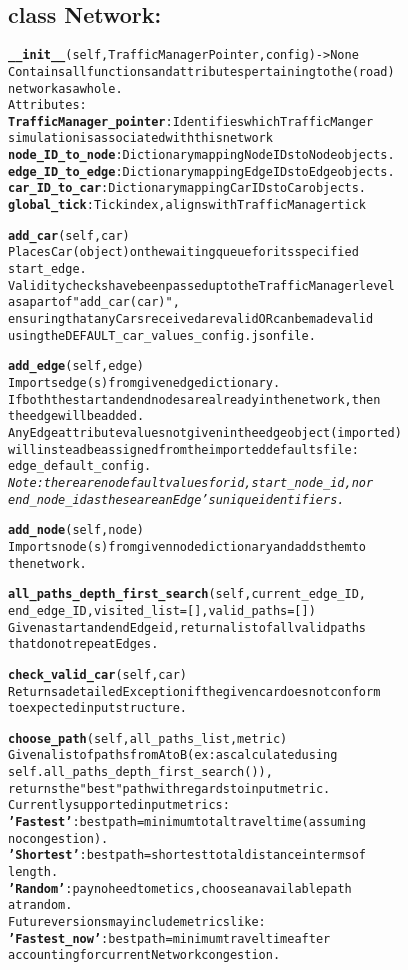 \subsection{class Network:}
\begin{alltt}

\textbf{__init__}(self, TrafficManagerPointer, config) -> None
Contains all functions and attributes pertaining to the (road) 
network as a whole.
Attributes:
    \textbf{TrafficManager_pointer}:  Identifies which TrafficManger 
    simulation is associated with this network
    \textbf{node_ID_to_node}:  Dictionary mapping Node IDs to Node objects.
    \textbf{edge_ID_to_edge}:  Dictionary mapping Edge IDs to Edge objects.
    \textbf{car_ID_to_car}:  Dictionary mapping Car IDs to Car objects.
    \textbf{global_tick}:  Tick index, aligns with TrafficManager tick

\textbf{add_car}(self, car)
Places Car (object) on the waiting queue for its specified 
start_edge.
Validity checks have been passed up to the TrafficManager level 
as a part of "add_car(car)",
ensuring that any Cars received are valid OR can be made valid 
using the DEFAULT_car_values_config.json file.

\textbf{add_edge}(self, edge)
Imports edge(s) from given edge dictionary.
If both the start and end nodes are already in the network, then 
the edge will be added.
Any Edge attribute values not given in the edge object (imported) 
will instead be assigned from the imported defaults file:
edge_default_config.
\textit{Note:  there are no default values for id, start_node_id, nor 
end_node_id as these are an Edge's unique identifiers.}

\textbf{add_node}(self, node)
Imports node(s) from given node dictionary and adds them to 
the network.

\textbf{all_paths_depth_first_search}(self, current_edge_ID, 
end_edge_ID, visited_list=[], valid_paths=[])
Given a start and end Edge id, return a list of all valid paths 
that do not repeat Edges.

\textbf{check_valid_car}(self, car)
Returns a detailed Exception if the given car does not conform 
to expected input structure.

\textbf{choose_path}(self, all_paths_list, metric)
Given a list of paths from A to B (ex: as calculated using
self.all_paths_depth_first_search()),
returns the "best" path with regards to input metric.
Currently supported input metrics:
    \textbf{'Fastest'}: best path = minimum total travel time (assuming 
    no congestion).
    \textbf{'Shortest'}: best path = shortest total distance in terms of 
    length.
    \textbf{'Random'}:  pay no heed to metics, choose an available path 
    at random.
Future versions may include metrics like:
    \textbf{'Fastest_now'}: best path = minimum travel time after 
    accounting for current Network congestion.


\end{alltt}
